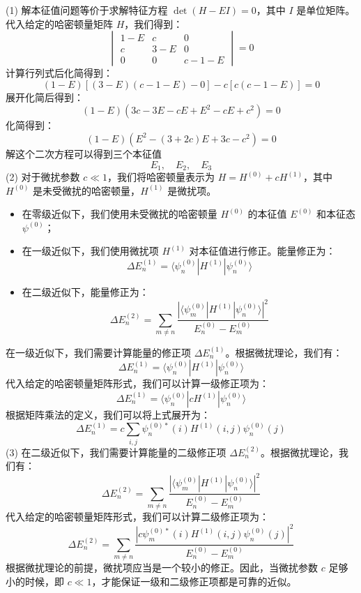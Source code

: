 \begin{solution}
    (1) 解本征值问题等价于求解特征方程 $\det(H-EI)=0$，其中 $I$ 是单位矩阵。代入给定的哈密顿量矩阵 $H$，我们得到：
    $$
        \begin{vmatrix}
            1-E & c   & 0     \\
            c   & 3-E & 0     \\
            0   & 0   & c-1-E
        \end{vmatrix} = 0
    $$
    计算行列式后化简得到：
    $$
        (1-E)[(3-E)(c-1-E) - 0] - c[c(c-1-E)] = 0
    $$
    展开化简后得到：
    $$
        (1-E)(3c - 3E - cE + E^2 - cE + c^2) = 0
    $$
    化简得到：
    $$
        (1-E)(E^2 - (3+2c)E + 3c - c^2) = 0
    $$
    解这个二次方程可以得到三个本征值
    $$
        E_1, \quad E_2, \quad E_3
    $$
    (2) 对于微扰参数 $c \ll 1$，我们将哈密顿量表示为 $H = H^{(0)} + cH^{(1)}$，其中 $H^{(0)}$ 是未受微扰的哈密顿量，$H^{(1)}$ 是微扰项。
    \begin{itemize}
        \item 在零级近似下，我们使用未受微扰的哈密顿量 $H^{(0)}$ 的本征值 $E^{(0)}$ 和本征态 $\psi^{(0)}$；
        \item 在一级近似下，我们使用微扰项 $H^{(1)}$ 对本征值进行修正。能量修正为：
              $$
                  \Delta E^{(1)}_n = \langle \psi^{(0)}_n | H^{(1)} | \psi^{(0)}_n \rangle
              $$
        \item  在二级近似下，能量修正为：
              $$
                  \Delta E^{(2)}_n = \sum_{m \neq n} \frac{|\langle \psi^{(0)}_m | H^{(1)} | \psi^{(0)}_n \rangle|^2}{E^{(0)}_n - E^{(0)}_m}
              $$
    \end{itemize}
    在一级近似下，我们需要计算能量的修正项 $\Delta E_n^{(1)}$。根据微扰理论，我们有：
    $$
        \Delta E_n^{(1)} = \langle\psi_n^{(0)}|H^{(1)}|\psi_n^{(0)}\rangle
    $$
    代入给定的哈密顿量矩阵形式，我们可以计算一级修正项为：
    $$
        \Delta E_n^{(1)} = \langle \psi_n^{(0)} | cH^{(1)} | \psi_n^{(0)} \rangle
    $$
    根据矩阵乘法的定义，我们可以将上式展开为：
    $$
        \Delta E_n^{(1)} = c \sum_{i,j} \psi_n^{(0)*}(i) H^{(1)}(i,j) \psi_n^{(0)}(j)
    $$
    (3) 在二级近似下，我们需要计算能量的二级修正项 $\Delta E_n^{(2)}$。根据微扰理论，我们有：
    $$
        \Delta E_n^{(2)} = \sum_{m \neq n} \frac{|\langle \psi_m^{(0)} | H^{(1)} | \psi_n^{(0)} \rangle|^2}{E_n^{(0)} - E_m^{(0)}}
    $$
    代入给定的哈密顿量矩阵形式，我们可以计算二级修正项为：
    $$
        \Delta E_n^{(2)} = \sum_{m \neq n} \frac{|c \psi_m^{(0)*}(i) H^{(1)}(i,j) \psi_n^{(0)}(j)|^2}{E_n^{(0)} - E_m^{(0)}}
    $$
    根据微扰理论的前提，微扰项应当是一个较小的修正。因此，当微扰参数 $c$ 足够小的时候，即 $c \ll 1$，才能保证一级和二级修正项都是可靠的近似。
\end{solution}



